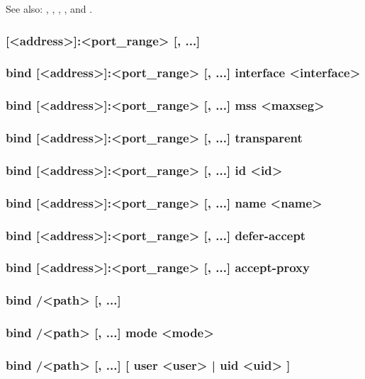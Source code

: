   See also: , , , ,
    and .

\subsubsection[bind]{ [<address>]:<port\_range> [, ...]}
\subsubsection*{bind [<address>]:<port\_range> [, ...] interface <interface>}
\subsubsection*{bind [<address>]:<port\_range> [, ...] mss <maxseg>}
\subsubsection*{bind [<address>]:<port\_range> [, ...] transparent}
\subsubsection*{bind [<address>]:<port\_range> [, ...] id <id>}
\subsubsection*{bind [<address>]:<port\_range> [, ...] name <name>}
\subsubsection*{bind [<address>]:<port\_range> [, ...] defer-accept}
\subsubsection*{bind [<address>]:<port\_range> [, ...] accept-proxy}
\subsubsection*{bind /<path> [, ...]}
\subsubsection*{bind /<path> [, ...] mode <mode>}
\subsubsection*{bind /<path> [, ...] [ user <user> | uid <uid> ]}
